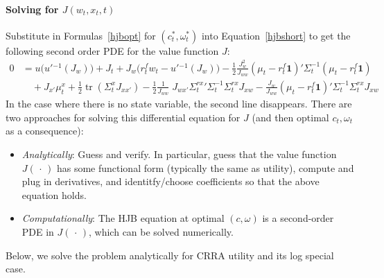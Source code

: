 \documentclass[12pt]{article}
\theoremstyle{plain}
\theoremstyle{definition}
\theoremstyle{remark}
\newcommand{\trace}{\operatorname{tr}}
\begin{document}
\paragraph{Solving for $J(w_t,x_t,t)$}
Substitute in Formulas~\ref{hjbopt} for $(c_t^*,\omega_t^*)$ into
Equation~\ref{hjbshort} to get the following second order PDE for the
value function $J$:
\begin{align*}
  0
  &=
  u\big(u'{}^{-1}(J_w)\big)
  +
  J_t
  +
  J_w
  \big(r^f_tw_t -u'{}^{-1}(J_w)\big)
  -
  \frac{1}{2}
  \frac{J_w^2}{J_{ww}}
  (\mu_t - r^f_t\mathbf{1})'
  \Sigma_t^{-1}
  (\mu_t - r^f_t\mathbf{1})
  \\
  &
  \quad
  +
  J_{x'}
  \mu_t^x
  +
  \frac{1}{2}
  \trace\left(
    \Sigma_t^x
    J_{xx'}
  \right)
  -
  \frac{1}{2}
  \frac{1}{J_{ww}}
  \;
  J_{wx'}
  \Sigma_t^{rx}{'}
  \Sigma_t^{-1}
  \Sigma_t^{rx}
  J_{xw}
  -
  \frac{J_w}{J_{ww}}
  (\mu_t - r^f_t\mathbf{1})'
  \Sigma_t^{-1}
  \Sigma_t^{rx}
  J_{xw}
\end{align*}
In the case where there is no state variable, the second line
disappears. There are two approaches for solving this differential
equation for $J$ (and then optimal $c_t,\omega_t$ as a consequence):
\begin{itemize}
  \item \emph{Analytically}:
    Guess and verify. In particular, guess that the value function
    $J(\,\cdot\,)$ has some functional form (typically the same as
    utility), compute and plug in derivatives, and identitfy/choose
    coefficients so that the above equation holds.

  \item
    \emph{Computationally}:
    The HJB equation at optimal $(c,\omega)$ is a second-order PDE in
    $J(\,\cdot\,)$, which can be solved numerically.
\end{itemize}
Below, we solve the problem analytically for CRRA utility and its log
special case.
\end{document}
